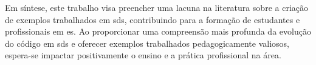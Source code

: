 Em síntese, este trabalho visa preencher uma lacuna na literatura sobre a criação de exemplos trabalhados em \gls{sds}, contribuindo para a formação de estudantes e profissionais em \gls{es}. Ao proporcionar uma compreensão mais profunda da evolução do código em \gls{sds} e oferecer exemplos trabalhados pedagogicamente valiosos, espera-se impactar positivamente o ensino e a prática profissional na área.

